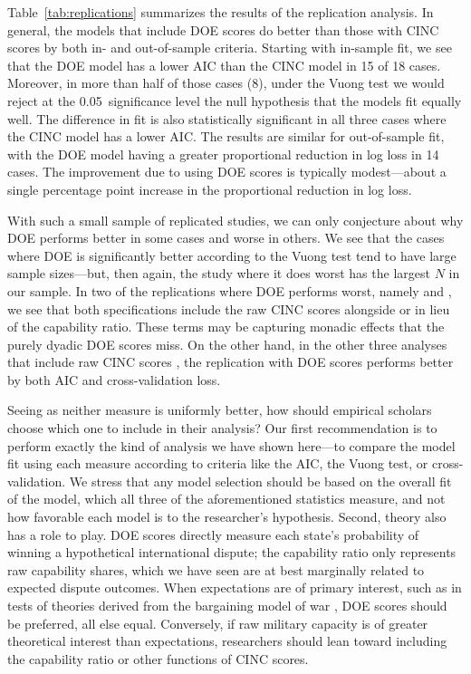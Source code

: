 Table~\ref{tab:replications} summarizes the results of the replication analysis.
In general, the models that include DOE scores do better than those with CINC scores by both in- and out-of-sample criteria.
Starting with in-sample fit, we see that the DOE model has a lower AIC than the CINC model in 15 of 18 cases.
Moreover, in more than half of those cases (8), under the Vuong test we would reject at the 0.05~significance level the null hypothesis that the models fit equally well.
The difference in fit is also statistically significant in all three cases where the CINC model has a lower AIC.
The results are similar for out-of-sample fit, with the DOE model having a greater proportional reduction in log loss in 14 cases.
The improvement due to using DOE scores is typically modest---about a single percentage point increase in the proportional reduction in log loss.

With such a small sample of replicated studies, we can only conjecture about why DOE performs better in some cases and worse in others.
We see that the cases where DOE is significantly better according to the Vuong test tend to have large sample sizes---but, then again, the study where it does worst has the largest $N$ in our sample.
In two of the replications where DOE performs worst, namely \citet{Bennett:2006gp} and \citet{Fordham:2008gs}, we see that both specifications include the raw CINC scores alongside or in lieu of the capability ratio.
These terms may be capturing monadic effects that the purely dyadic DOE scores miss.
On the other hand, in the other three analyses that include raw CINC scores \citep{Arena:2009gk,Zawahri:2011iy,Weeks:2012be}, the replication with DOE scores performs better by both AIC and cross-validation loss.

Seeing as neither measure is uniformly better, how should empirical scholars choose which one to include in their analysis?
Our first recommendation is to perform exactly the kind of analysis we have shown here---to compare the model fit using each measure according to criteria like the AIC, the Vuong test, or cross-validation.
We stress that any model selection should be based on the overall fit of the model, which all three of the aforementioned statistics measure, and not how favorable each model is to the researcher's hypothesis.
Second, theory also has a role to play.
DOE scores directly measure each state's probability of winning a hypothetical international dispute; the capability ratio only represents raw capability shares, which we have seen are at best marginally related to expected dispute outcomes.
When expectations are of primary interest, such as in tests of theories derived from the bargaining model of war \citep{fearon1995}, DOE scores should be preferred, all else equal.
Conversely, if raw military capacity is of greater theoretical interest than expectations, researchers should lean toward including the capability ratio or other functions of CINC scores.

